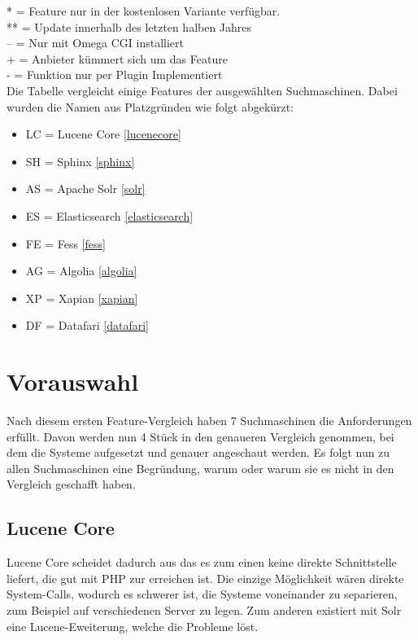\begin{table}
    *  = Feature nur in der kostenlosen Variante verfügbar. \\
    ** = Update innerhalb des letzten halben Jahres \\
    -- = Nur mit Omega CGI installiert \\
    +  = Anbieter kümmert sich um das Feature \\
    -  = Funktion nur per Plugin Implementiert \\

    Die Tabelle vergleicht einige Features der ausgewählten Suchmaschinen. Dabei wurden die Namen aus Platzgründen wie folgt abgekürzt:

    \begin{itemize}
        \item LC = Lucene Core \ref{lucenecore}
        \item SH = Sphinx \ref{sphinx}
        \item AS = Apache Solr \ref{solr}
        \item ES = Elasticsearch \ref{elasticsearch}
        \item FE = Fess \ref{fess}
        \item AG = Algolia \ref{algolia}
        \item XP = Xapian \ref{xapian}
        \item DF = Datafari \ref{datafari}
    \end{itemize} 


\end{table}

\section{Vorauswahl}

Nach diesem ersten Feature-Vergleich haben 7 Suchmaschinen die Anforderungen erfüllt. Davon werden nun 4 Stück in den genaueren Vergleich genommen, bei dem die Systeme aufgesetzt und genauer angeschaut werden. Es folgt nun zu allen Suchmaschinen eine Begründung, warum oder warum sie es nicht in den Vergleich geschafft haben.

\subsection{Lucene Core}

Lucene Core scheidet dadurch aus das es zum einen keine direkte Schnittstelle liefert, die gut mit PHP zur erreichen ist. Die einzige Möglichkeit wären direkte System-Calls, wodurch es schwerer ist, die Systeme voneinander zu separieren, zum Beispiel auf verschiedenen Server zu legen. Zum anderen existiert mit Solr eine Lucene-Eweiterung, welche die Probleme löst. \cite{TheApacheSoftwareFoundation.2019b}

